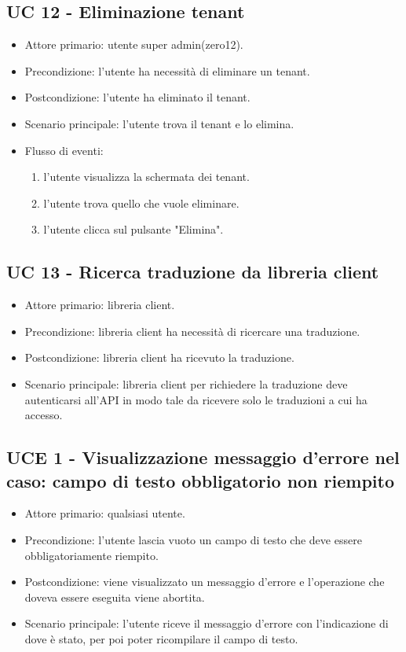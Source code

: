 \subsection{UC 12 - Eliminazione tenant}
    \begin{itemize}
        \item Attore primario: utente super admin(zero12).
        \item Precondizione: l'utente ha necessità di eliminare un tenant.
        \item Postcondizione: l'utente ha eliminato il tenant.
        \item Scenario principale: l'utente trova il tenant e lo elimina.
        \item Flusso di eventi:
            \begin{enumerate}
                \item l'utente visualizza la schermata dei tenant.
                \item l'utente trova quello che vuole eliminare.
                \item l'utente clicca sul pulsante "Elimina".
            \end{enumerate}
    \end{itemize}
\subsection{UC 13 - Ricerca traduzione da libreria client}
    \begin{itemize}
        \item Attore primario: libreria client.
        \item Precondizione: libreria client ha necessità di ricercare una traduzione.
        \item Postcondizione: libreria client ha ricevuto la traduzione.
        \item Scenario principale: libreria client per richiedere la traduzione deve autenticarsi all'API in modo tale da ricevere solo le traduzioni a cui ha accesso.
    \end{itemize}
\subsection{UCE 1 - Visualizzazione messaggio d'errore nel caso: campo di testo obbligatorio non riempito}
    \begin{itemize}
        \item Attore primario: qualsiasi utente.
        \item Precondizione: l'utente lascia vuoto un campo di testo che deve essere obbligatoriamente riempito.
        \item Postcondizione: viene visualizzato un messaggio d'errore e l'operazione che doveva essere eseguita viene abortita.
        \item Scenario principale: l'utente riceve il messaggio d'errore con l'indicazione di dove è stato, per poi poter ricompilare il campo di testo.
    \end{itemize}
